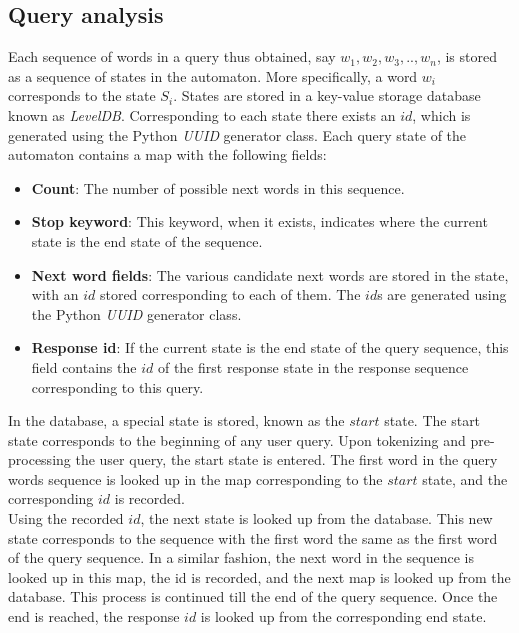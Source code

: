 \documentclass[12pt,a4paper]{article}
\begin{document}
\subsection{Query analysis}
Each sequence of words in a query thus obtained, say $w_{1}, w_{2}, w_{3}, .., w_{n}$, is stored as a sequence of states in the automaton. More specifically, a word $w_{i}$ corresponds to the state $S_{i}$. States are stored in a key-value storage database known as \textit{LevelDB}. Corresponding to each state there exists an $id$, which is generated using the Python \textit{UUID} generator class. Each query state of the automaton contains a map with the following fields:

\begin{itemize}
\item \textbf{Count}: The number of possible next words in this sequence.
\item \textbf{Stop keyword}: This keyword, when it exists, indicates where the current state is the end state of the sequence.
\item \textbf{Next word fields}: The various candidate next words are stored in the state, with an $id$ stored corresponding to each of them. The $id$s are generated using the Python \textit{UUID} generator class.
\item \textbf{Response id}: If the current state is the end state of the query sequence, this field contains the $id$ of the first response state in the response sequence corresponding to this query.
\end{itemize}

In the database, a special state is stored, known as the $start$ state. The start state corresponds to the beginning of any user query. Upon tokenizing and pre-processing the user query, the start state is entered. The first word in the query words sequence is looked up in the map corresponding to the $start$ state, and the corresponding $id$ is recorded.\\

Using the recorded $id$, the next state is looked up from the database. This new state corresponds to the sequence with the first word the same as the first word of the query sequence. In a similar fashion, the next word in the sequence is looked up in this map, the id is recorded, and the next map is looked up from the database. This process is continued till the end of the query sequence. Once the end is reached, the response $id$ is looked up from the corresponding end state.\\
\end{document}
